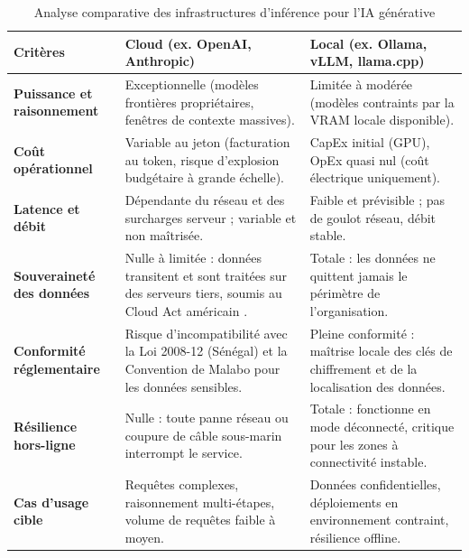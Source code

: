 \begin{table}[H]
  \centering
  \caption{Analyse comparative des infrastructures d'inférence pour l'IA générative}
  \label{tab:rag_cloud_local}
  \small
  \begin{tabular}{|p{3cm}|p{5.5cm}|p{5.5cm}|}
    \hline
    \textbf{Critères} & \textbf{Cloud (ex. OpenAI, Anthropic)} & \textbf{Local (ex. Ollama, vLLM, llama.cpp)} \\
    \hline
    \textbf{Puissance et raisonnement} &
      Exceptionnelle (modèles frontières propriétaires, fenêtres de contexte massives). &
      Limitée à modérée (modèles contraints par la VRAM locale disponible). \\
    \hline
    \textbf{Coût opérationnel} &
      Variable au jeton (facturation au token, risque d'explosion budgétaire à grande échelle). &
      CapEx initial (GPU), OpEx quasi nul (coût électrique uniquement). \\
    \hline
    \textbf{Latence et débit} &
      Dépendante du réseau et des surcharges serveur ; variable et non maîtrisée. &
      Faible et prévisible ; pas de goulot réseau, débit stable. \\
    \hline
    \textbf{Souveraineté des données} &
      Nulle à limitée : données transitent et sont traitées sur des serveurs tiers, soumis au Cloud Act américain \cite{anssibsiCloudSovereignty2025}. &
      Totale : les données ne quittent jamais le périmètre de l'organisation. \\
    \hline
    \textbf{Conformité réglementaire} &
      Risque d'incompatibilité avec la Loi 2008-12 (Sénégal) \cite{senegalLoi200812} et la Convention de Malabo \cite{uaConventionMalabo2014} pour les données sensibles. &
      Pleine conformité : maîtrise locale des clés de chiffrement et de la localisation des données. \\
    \hline
    \textbf{Résilience hors-ligne} &
      Nulle : toute panne réseau ou coupure de câble sous-marin \cite{cariolleInfrastructuresEconomieNumeriques2018} interrompt le service. &
      Totale : fonctionne en mode déconnecté, critique pour les zones à connectivité instable. \\
    \hline
    \textbf{Cas d'usage cible} &
      Requêtes complexes, raisonnement multi-étapes, volume de requêtes faible à moyen. &
      Données confidentielles, déploiements en environnement contraint, résilience offline. \\
    \hline
  \end{tabular}
\end{table}

